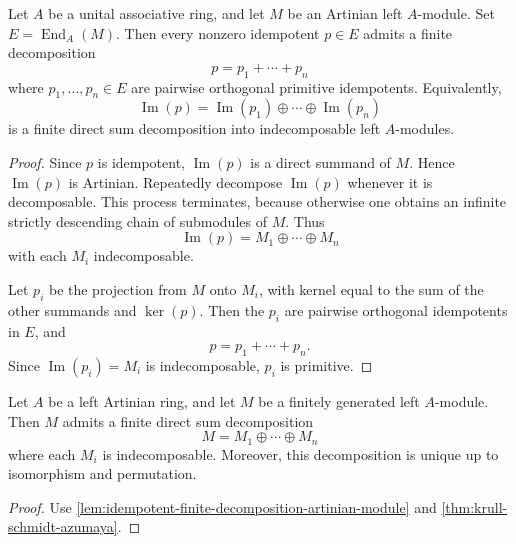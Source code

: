 \begin{lemma}
\label{lem:idempotent-finite-decomposition-artinian-module}
Let \(A\) be a unital associative ring, and let \(M\) be an Artinian left
\(A\)-module. Set \(E=\operatorname{End}_A(M)\). Then every nonzero
idempotent \(p\in E\) admits a finite decomposition
\[
p=p_1+\cdots+p_n
\]
where \(p_1,\dots,p_n\in E\) are pairwise orthogonal primitive idempotents.
Equivalently,
\[
\operatorname{Im}(p)
=
\operatorname{Im}(p_1)\oplus\cdots\oplus \operatorname{Im}(p_n)
\]
is a finite direct sum decomposition into indecomposable left
\(A\)-modules.
\end{lemma}

\begin{proof}
Since \(p\) is idempotent, \(\operatorname{Im}(p)\) is a direct summand of
\(M\). Hence \(\operatorname{Im}(p)\) is Artinian. Repeatedly decompose
\(\operatorname{Im}(p)\) whenever it is decomposable. This process terminates,
because otherwise one obtains an infinite strictly descending chain of
submodules of \(M\). Thus
\[
\operatorname{Im}(p)=M_1\oplus\cdots\oplus M_n
\]
with each \(M_i\) indecomposable.

Let \(p_i\) be the projection from \(M\) onto \(M_i\), with kernel equal to
the sum of the other summands and \(\ker(p)\). Then the \(p_i\) are pairwise
orthogonal idempotents in \(E\), and
\[
p=p_1+\cdots+p_n.
\]
Since \(\operatorname{Im}(p_i)=M_i\) is indecomposable, \(p_i\) is primitive.
\end{proof}





\begin{corollary}
\label{cor:krull-schmidt-artinian}
Let \(A\) be a left Artinian ring, and let \(M\) be a finitely generated
left \(A\)-module. Then \(M\) admits a finite direct sum decomposition
\[
M=M_1\oplus\cdots\oplus M_n
\]
where each \(M_i\) is indecomposable. Moreover, this decomposition is unique
up to isomorphism and permutation.
\end{corollary}

\begin{proof}
    Use \autoref{lem:idempotent-finite-decomposition-artinian-module} and \autoref{thm:krull-schmidt-azumaya}.
\end{proof}


